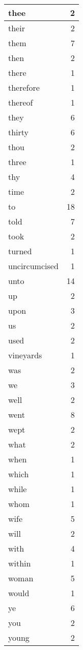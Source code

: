 \begin{center}
\begin{longtable}{l|r}
thee & 2\\ \hline 
their & 2\\ \hline 
them & 7\\ \hline 
then & 2\\ \hline 
there & 1\\ \hline 
therefore & 1\\ \hline 
thereof & 1\\ \hline 
they & 6\\ \hline 
thirty & 6\\ \hline 
thou & 2\\ \hline 
three & 1\\ \hline 
thy & 4\\ \hline 
time & 2\\ \hline 
to & 18\\ \hline 
told & 7\\ \hline 
took & 2\\ \hline 
turned & 1\\ \hline 
uncircumcised & 1\\ \hline 
unto & 14\\ \hline 
up & 2\\ \hline 
upon & 3\\ \hline 
us & 2\\ \hline 
used & 2\\ \hline 
vineyards & 1\\ \hline 
was & 2\\ \hline 
we & 3\\ \hline 
well & 2\\ \hline 
went & 8\\ \hline 
wept & 2\\ \hline 
what & 2\\ \hline 
when & 1\\ \hline 
which & 1\\ \hline 
while & 1\\ \hline 
whom & 1\\ \hline 
wife & 5\\ \hline 
will & 2\\ \hline 
with & 4\\ \hline 
within & 1\\ \hline 
woman & 5\\ \hline 
would & 1\\ \hline 
ye & 6\\ \hline 
you & 2\\ \hline 
young & 2\\ \hline 
\end{longtable}
\end{center}



